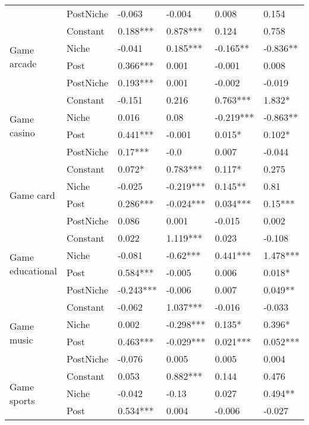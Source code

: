 \begin{table}[h!]
\begin{tabular}{llllll}
          & PostNiche &  -0.063 &  -0.004 &  0.008 &  0.154 \\
\cline{1-6}
\multirow{4}{*}{Game arcade} & Constant &  0.188*** &  0.878*** &  0.124 &  0.758 \\
          & Niche &  -0.041 &  0.185*** &  -0.165** &  -0.836** \\
          & Post &  0.366*** &  0.001 &  -0.001 &  0.008 \\
          & PostNiche &  0.193*** &  0.001 &  -0.002 &  -0.019 \\
\cline{1-6}
\multirow{4}{*}{Game casino} & Constant &  -0.151 &  0.216 &  0.763*** &  1.832* \\
          & Niche &  0.016 &  0.08 &  -0.219*** &  -0.863** \\
          & Post &  0.441*** &  -0.001 &  0.015* &  0.102* \\
          & PostNiche &  0.17*** &  -0.0 &  0.007 &  -0.044 \\
\cline{1-6}
\multirow{4}{*}{Game card} & Constant &  0.072* &  0.783*** &  0.117* &  0.275 \\
          & Niche &  -0.025 &  -0.219*** &  0.145** &  0.81 \\
          & Post &  0.286*** &  -0.024*** &  0.034*** &  0.15*** \\
          & PostNiche &  0.086 &  0.001 &  -0.015 &  0.002 \\
\cline{1-6}
\multirow{4}{*}{Game educational} & Constant &  0.022 &  1.119*** &  0.023 &  -0.108 \\
          & Niche &  -0.081 &  -0.62*** &  0.441*** &  1.478*** \\
          & Post &  0.584*** &  -0.005 &  0.006 &  0.018* \\
          & PostNiche &  -0.243*** &  -0.006 &  0.007 &  0.049** \\
\cline{1-6}
\multirow{4}{*}{Game music} & Constant &  -0.062 &  1.037*** &  -0.016 &  -0.033 \\
          & Niche &  0.002 &  -0.298*** &  0.135* &  0.396* \\
          & Post &  0.463*** &  -0.029*** &  0.021*** &  0.052*** \\
          & PostNiche &  -0.076 &  0.005 &  0.005 &  0.004 \\
\cline{1-6}
\multirow{4}{*}{Game sports} & Constant &  0.053 &  0.882*** &  0.144 &  0.476 \\
          & Niche &  -0.042 &  -0.13 &  0.027 &  0.494** \\
          & Post &  0.534*** &  0.004 &  -0.006 &  -0.027 \\

\end{tabular}
\end{table}

